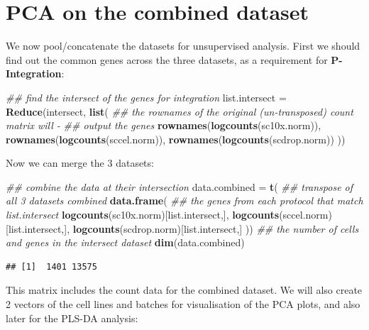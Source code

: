 \documentclass[]{book}
\newenvironment{Shaded}{\begin{snugshade}}{\end{snugshade}}
\newcommand{\CommentTok}[1]{\textcolor[rgb]{0.56,0.35,0.01}{\textit{#1}}}
\newcommand{\KeywordTok}[1]{\textcolor[rgb]{0.13,0.29,0.53}{\textbf{#1}}}
\newcommand{\NormalTok}[1]{#1}
\newcommand{\StringTok}[1]{\textcolor[rgb]{0.31,0.60,0.02}{#1}}
\theoremstyle{definition}
\theoremstyle{definition}
\theoremstyle{definition}
\theoremstyle{remark}
\begin{document}
\hypertarget{pca-on-the-combined-dataset}{%
\section{PCA on the combined
dataset}\label{pca-on-the-combined-dataset}}

We now pool/concatenate the datasets for unsupervised analysis. First we
should find out the common genes across the three datasets, as a
requirement for \textbf{P-Integration}:

\begin{Shaded}
\begin{Highlighting}[]
\CommentTok{## find the intersect of the genes for integration}
\NormalTok{list.intersect =}\StringTok{ }\KeywordTok{Reduce}\NormalTok{(intersect, }\KeywordTok{list}\NormalTok{(}
\CommentTok{## the rownames of the original (un-transposed) count matrix will -}
\CommentTok{## output the genes}
  \KeywordTok{rownames}\NormalTok{(}\KeywordTok{logcounts}\NormalTok{(sc10x.norm)),}
  \KeywordTok{rownames}\NormalTok{(}\KeywordTok{logcounts}\NormalTok{(sccel.norm)),}
  \KeywordTok{rownames}\NormalTok{(}\KeywordTok{logcounts}\NormalTok{(scdrop.norm))}
\NormalTok{))}
\end{Highlighting}
\end{Shaded}

Now we can merge the 3 datasets:

\begin{Shaded}
\begin{Highlighting}[]
\CommentTok{## combine the data at their intersection}
\NormalTok{data.combined =}\StringTok{ }\KeywordTok{t}\NormalTok{( }\CommentTok{## transpose of all 3 datasets combined}
  \KeywordTok{data.frame}\NormalTok{(}
    \CommentTok{## the genes from each protocol that match list.intersect}
    \KeywordTok{logcounts}\NormalTok{(sc10x.norm)[list.intersect,],}
    \KeywordTok{logcounts}\NormalTok{(sccel.norm)[list.intersect,],}
    \KeywordTok{logcounts}\NormalTok{(scdrop.norm)[list.intersect,] ))}
\CommentTok{## the number of cells and genes in the intersect dataset}
\KeywordTok{dim}\NormalTok{(data.combined)}
\end{Highlighting}
\end{Shaded}

\begin{verbatim}
## [1]  1401 13575
\end{verbatim}

This matrix includes the count data for the combined dataset. We will
also create 2 vectors of the cell lines and batches for visualisation of
the PCA plots, and also later for the PLS-DA analysis:
\end{document}
